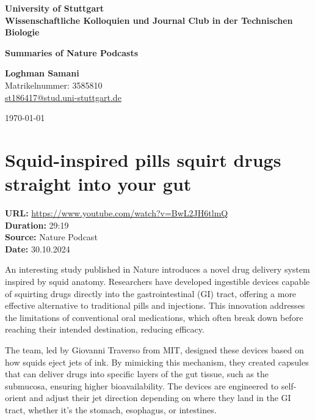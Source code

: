 \documentclass[12pt]{article}
\begin{document}
\begin{titlepage}
    \centering
    
    \vspace*{0.5cm}
    \Large
    \textbf{University of Stuttgart} \\
    \textbf{Wissenschaftliche Kolloquien und Journal Club in der Technischen Biologie} \\
  
    
    \vspace{1.5cm}
    
    \Huge
    \textbf{Summaries of Nature Podcasts} \\
    
    \vspace{1cm}
    
    \Large
    \textbf{Loghman Samani} \\
    Matrikelnummer: 3585810 \\
    \href{mailto:st186417@stud.uni-stuttgart.de}{st186417@stud.uni-stuttgart.de}
    
    \vspace{1.5cm}
    
    \today
\end{titlepage}
\newpage
\tableofcontents
\newpage

\section{Squid-inspired pills squirt drugs straight into your gut}
\textbf{URL:} \url{https://www.youtube.com/watch?v=BwL2JH6tlmQ}\\
\textbf{Duration:} 29:19\\
\textbf{Source:} Nature Podcast\\
\textbf{Date:} 30.10.2024

An interesting study published in Nature introduces a novel drug delivery system inspired by squid anatomy. Researchers have developed ingestible devices capable of squirting drugs directly into the gastrointestinal (GI) tract, offering a more effective alternative to traditional pills and injections. This innovation addresses the limitations of conventional oral medications, which often break down before reaching their intended destination, reducing efficacy.

The team, led by Giovanni Traverso from MIT, designed these devices based on how squids eject jets of ink. By mimicking this mechanism, they created capsules that can deliver drugs into specific layers of the gut tissue, such as the submucosa, ensuring higher bioavailability. The devices are engineered to self-orient and adjust their jet direction depending on where they land in the GI tract, whether it’s the stomach, esophagus, or intestines.
\end{document}
